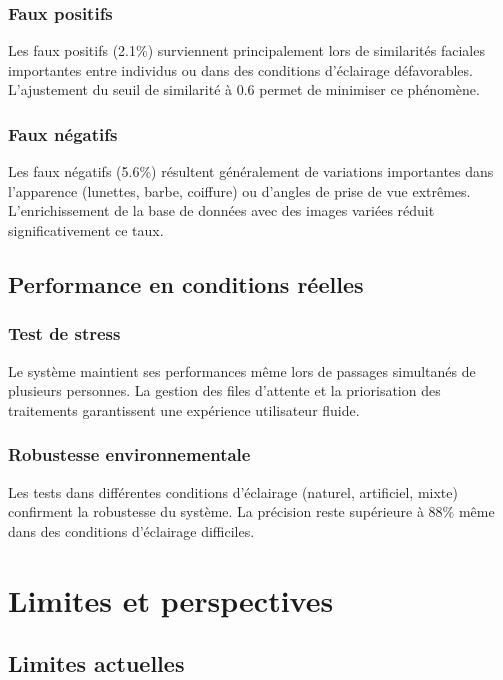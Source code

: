 \documentclass[12pt,a4paper]{article}
\begin{document}
\subsubsection{Faux positifs}
Les faux positifs (2.1\%) surviennent principalement lors de similarités faciales importantes entre individus ou dans des conditions d'éclairage défavorables. L'ajustement du seuil de similarité à 0.6 permet de minimiser ce phénomène.

\subsubsection{Faux négatifs}
Les faux négatifs (5.6\%) résultent généralement de variations importantes dans l'apparence (lunettes, barbe, coiffure) ou d'angles de prise de vue extrêmes. L'enrichissement de la base de données avec des images variées réduit significativement ce taux.

\subsection{Performance en conditions réelles}
\label{sec:real-world}

\subsubsection{Test de stress}
Le système maintient ses performances même lors de passages simultanés de plusieurs personnes. La gestion des files d'attente et la priorisation des traitements garantissent une expérience utilisateur fluide.

\subsubsection{Robustesse environnementale}
Les tests dans différentes conditions d'éclairage (naturel, artificiel, mixte) confirment la robustesse du système. La précision reste supérieure à 88\% même dans des conditions d'éclairage difficiles.


\newpage

\section{Limites et perspectives}

\subsection{Limites actuelles}
\end{document}
